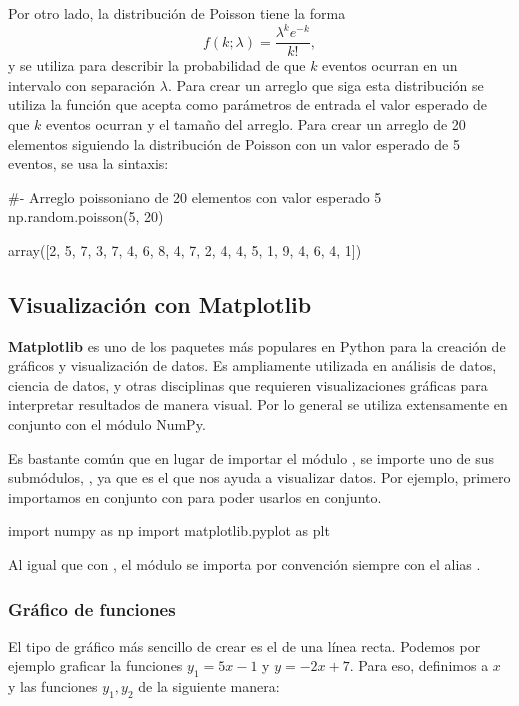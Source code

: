Por otro lado, la distribución de Poisson tiene la forma
\[ f(k; \lambda) = \frac{\lambda^k e^{-k}}{k!}, \]
y se utiliza para describir la probabilidad de que $k$ eventos ocurran en un intervalo con separación $\lambda$. Para crear un arreglo que siga esta distribución se utiliza la función  que acepta como parámetros de entrada el valor esperado de que $k$ eventos ocurran y el tamaño del arreglo. Para crear un arreglo de 20 elementos siguiendo la distribución de Poisson con un valor esperado de 5 eventos, se usa la sintaxis:

\begin{pyin}[]
#- Arreglo poissoniano de 20 elementos con valor esperado 5
np.random.poisson(5, 20) 
\end{pyin}
\begin{pyout}
array([2, 5, 7, 3, 7, 4, 6, 8, 4, 7, 2, 4, 4, 5, 1, 9, 4, 6, 4, 1])
\end{pyout}

\subsection{Visualización con Matplotlib}
\textbf{Matplotlib} es uno de los paquetes más populares en Python para la creación de gráficos y visualización de datos. Es ampliamente utilizada en análisis de datos, ciencia de datos, y otras disciplinas que requieren visualizaciones gráficas para interpretar resultados de manera visual. Por lo general se utiliza extensamente en conjunto con el módulo NumPy.

Es bastante común que en lugar de importar el módulo , se importe uno de sus submódulos, , ya que es el que nos ayuda a visualizar datos. Por ejemplo, primero importamos  en conjunto con  para poder usarlos en conjunto.

\begin{pyin}
import numpy as np
import matplotlib.pyplot as plt
\end{pyin}
Al igual que con , el módulo  se importa por convención siempre con el alias . 
\subsubsection{Gráfico de funciones}

El tipo de gráfico más sencillo de crear es el de una línea recta. Podemos por ejemplo graficar la funciones $ y_1 = 5x - 1 $ y $ y = -2x + 7 $. Para eso, definimos a $ x $ y las funciones $ y_1, y_2 $ de la siguiente manera:

